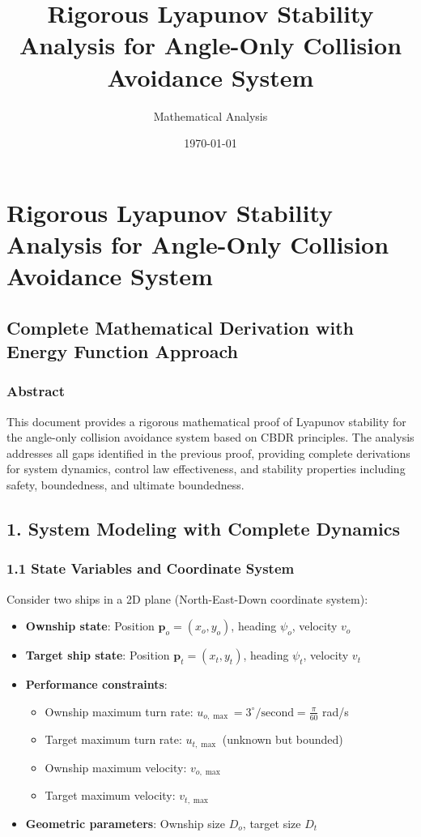 \documentclass[11pt,a4paper]{article}
\title{Rigorous Lyapunov Stability Analysis for Angle-Only Collision Avoidance System}
\author{Mathematical Analysis}
\date{\today}
\numberwithin{equation}{section}
\begin{document}
\maketitle

\tableofcontents
\newpage

\section{Rigorous Lyapunov Stability Analysis for Angle-Only Collision Avoidance System}

\subsection{Complete Mathematical Derivation with Energy Function Approach}

\subsubsection{Abstract}
This document provides a rigorous mathematical proof of Lyapunov stability for the angle-only collision avoidance system based on CBDR principles. The analysis addresses all gaps identified in the previous proof, providing complete derivations for system dynamics, control law effectiveness, and stability properties including safety, boundedness, and ultimate boundedness.

\subsection{1. System Modeling with Complete Dynamics}

\subsubsection{1.1 State Variables and Coordinate System}

Consider two ships in a 2D plane (North-East-Down coordinate system):
\begin{itemize}
\item \textbf{Ownship state}: Position $\mathbf{p}_o = (x_o, y_o)$, heading $\psi_o$, velocity $v_o$
\item \textbf{Target ship state}: Position $\mathbf{p}_t = (x_t, y_t)$, heading $\psi_t$, velocity $v_t$
\item \textbf{Performance constraints}:
   \begin{itemize}
   \item Ownship maximum turn rate: $u_{o,\max} = 3^\circ/\mathrm{second} = \frac{\pi}{60}$ rad/s
   \item Target maximum turn rate: $u_{t,\max}$ (unknown but bounded)
   \item Ownship maximum velocity: $v_{o,\max}$
   \item Target maximum velocity: $v_{t,\max}$
   \end{itemize}
\item \textbf{Geometric parameters}: Ownship size $D_o$, target size $D_t$
\end{itemize}
\end{document}
